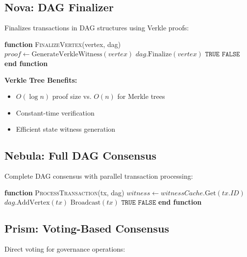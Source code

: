 \subsection{Nova: DAG Finalizer}

Finalizes transactions in DAG structures using Verkle proofs:



\begin{algorithmic}[1]
\State \textbf{function} \textsc{FinalizeVertex}(vertex, dag)
    \State $proof \gets \text{GenerateVerkleWitness}(vertex)$
        \State $dag.\text{Finalize}(vertex)$
        \State \Return $\texttt{TRUE}$
    \EndIf
    \State \Return $\texttt{FALSE}$
\State \textbf{end function}
\end{algorithmic}


\textbf{Verkle Tree Benefits:}
\begin{itemize}
\item $O(\log n)$ proof size vs. $O(n)$ for Merkle trees
\item Constant-time verification
\item Efficient state witness generation
\end{itemize}

\subsection{Nebula: Full DAG Consensus}

Complete DAG consensus with parallel transaction processing:



\begin{algorithmic}[1]
\State \textbf{function} \textsc{ProcessTransaction}(tx, dag)
    \State $witness \gets witnessCache.\text{Get}(tx.ID)$
        \State $dag.\text{AddVertex}(tx)$
        \State $\text{Broadcast}(tx)$ 
        \State \Return $\texttt{TRUE}$
    \EndIf
    \State \Return $\texttt{FALSE}$
\State \textbf{end function}
\end{algorithmic}


\subsection{Prism: Voting-Based Consensus}

Direct voting for governance operations:




